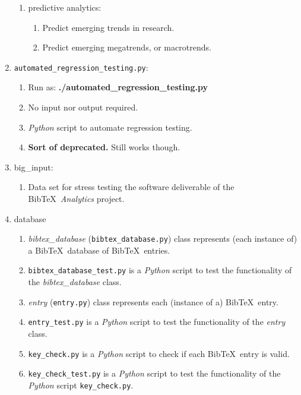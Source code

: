 \begin{enumerate}
\begin{enumerate}
	\item predictive analytics: \vspace{-0.2cm}
		\begin{enumerate} \itemsep -2pt
		\item Predict emerging trends in research.
		\item Predict emerging megatrends, or macrotrends.
		\end{enumerate}
	\end{enumerate}
\item {\tt automated\_regression\_testing.py}: \vspace{-0.3cm}
	\begin{enumerate} \itemsep -2pt
	\item Run as: {\bf ./automated\_regression\_testing.py}
	\item No input nor output required.
	\item {\it Python} script to automate regression testing.
	\item {\bf Sort of deprecated.} Still works though.
	\end{enumerate}
\item big\_input: \vspace{-0.3cm}
	\begin{enumerate} \itemsep -2pt
	\item Data set for stress testing the software deliverable of the {\sc Bib}\TeX\ {\it Analytics} project.
	\end{enumerate}
\item database \vspace{-0.3cm}
	\begin{enumerate} \itemsep -2pt
	\item {\it bibtex\_database} ({\tt bibtex\_database.py}) class represents (each instance of) a {\sc Bib}\TeX\ database of {\sc Bib}\TeX\ entries.
	\item {\tt bibtex\_database\_test.py} is a {\it Python} script to test the functionality of the {\it bibtex\_database} class.
	\item {\it entry} ({\tt entry.py}) class represents each (instance of a) {\sc Bib}\TeX\ entry.
	\item {\tt entry\_test.py} is a {\it Python} script to test the functionality of the {\it entry} class.
	\item {\tt key\_check.py} is a {\it Python} script to check if each {\sc Bib}\TeX\ entry is valid.
	\item {\tt key\_check\_test.py} is a {\it Python} script to test the functionality of the {\it Python} script {\tt key\_check.py}.

\end{enumerate}
\end{enumerate}
